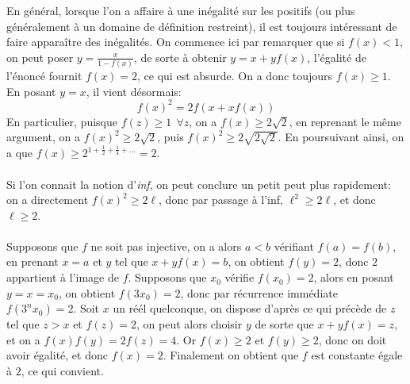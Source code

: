 \begin{sol}
En général, lorsque l'on a affaire à une inégalité sur les positifs (ou plus généralement à un domaine de définition restreint), il est toujours intéressant de faire apparaître des inégalités. On commence ici par remarquer que si $f(x)<1$, on peut poser $y=\frac{x}{1-f(x)}$, de sorte à obtenir $y=x+yf(x)$, l'égalité de l'énoncé fournit $f(x)=2$, ce qui est absurde. On a donc toujours $f(x)\ge 1$. En posant $y=x$, il vient désormais:
$$f(x)^2=2f(x+xf(x))$$
En particulier, puisque $f(z)\ge 1~~\forall z $, on a $f(x)\ge 2\sqrt{2}$, en reprenant le même argument, on a $f(x)^2\ge 2\sqrt{2}$, puis $f(x)^2\ge 2\sqrt{2\sqrt{2}}$. En poursuivant ainsi, on a que $f(x)\ge 2^{1+\frac{1}{2}+\frac{1}{4}+...}=2$.\\\\ Si l'on connait la notion d'\textit{inf}, on peut conclure un petit peut plus rapidement: on a directement $f(x)^2\ge 2\ell$, donc par passage à l'inf, $\ell^2 \ge 2\ell$, et donc $\ell\ge 2$. \\\\
Supposons que $f$ ne soit pas injective, on a alors $a<b$ vérifiant $f(a)=f(b)$, en prenant $x=a$ et $y$ tel que $x+yf(x)=b$, on obtient $f(y)=2$, donc $2$ appartient à l'image de $f$. Supposons que $x_0$ vérifie $f(x_0)=2$, alors en posant $y=x=x_0$, on obtient $f(3x_0)=2$, donc par récurrence immédiate $f(3^n x_0)=2$. Soit $x$ un réél quelconque, on dispose d'après ce qui précède de $z$ tel que $z>x$ et $f(z)=2$, on peut alors choisir $y$ de sorte que $x+yf(x)=z$, et on a $f(x)f(y)=2f(z)=4$. Or $f(x)\ge 2$ et $f(y)\ge 2$, donc on doit avoir égalité, et donc $f(x)=2$. Finalement on obtient que $f$ est constante égale à $2$, ce qui convient.
\end{sol}